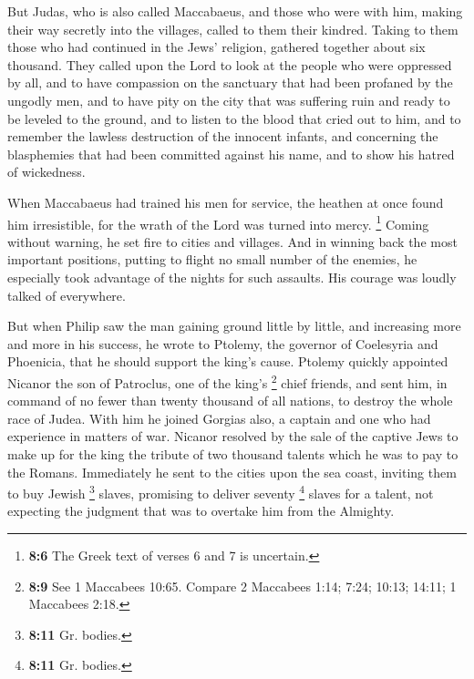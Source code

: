  But Judas, who is also called Maccabaeus, and those who
were with him, making their way secretly into the villages, called to
them their kindred. Taking to them those who had continued in the Jews'
religion, gathered together about six thousand.  They
called upon the Lord to look at the people who were oppressed by all,
and to have compassion on the sanctuary that had been profaned by the
ungodly men,  and to have pity on the city that was
suffering ruin and ready to be leveled to the ground, and to listen to
the blood that cried out to him,  and to remember the
lawless destruction of the innocent infants, and concerning the
blasphemies that had been committed against his name, and to show his
hatred of wickedness.

 When Maccabaeus had trained his men for service, the
heathen at once found him irresistible, for the wrath of the Lord was
turned into mercy.  \footnote{\textbf{8:6} The Greek text
  of verses 6 and 7 is uncertain.} Coming without warning, he set fire
to cities and villages. And in winning back the most important
positions, putting to flight no small number of the enemies,
 he especially took advantage of the nights for such
assaults. His courage was loudly talked of everywhere.

 But when Philip saw the man gaining ground little by
little, and increasing more and more in his success, he wrote to
Ptolemy, the governor of Coelesyria and Phoenicia, that he should
support the king's cause.  Ptolemy quickly appointed
Nicanor the son of Patroclus, one of the king's \footnote{\textbf{8:9}
  See 1 Maccabees 10:65. Compare 2 Maccabees 1:14; 7:24; 10:13; 14:11; 1
  Maccabees 2:18.} chief friends, and sent him, in command of no fewer
than twenty thousand of all nations, to destroy the whole race of Judea.
With him he joined Gorgias also, a captain and one who had experience in
matters of war.  Nicanor resolved by the sale of the
captive Jews to make up for the king the tribute of two thousand talents
which he was to pay to the Romans.  Immediately he sent
to the cities upon the sea coast, inviting them to buy Jewish
\footnote{\textbf{8:11} Gr. bodies.} slaves, promising to deliver
seventy \footnote{\textbf{8:11} Gr. bodies.} slaves for a talent, not
expecting the judgment that was to overtake him from the Almighty.

